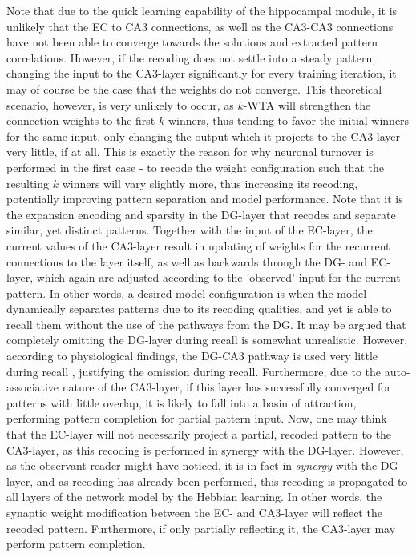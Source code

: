 Note that due to the quick learning capability of the hippocampal module, it is unlikely that the EC to CA3 connections, as well as the CA3-CA3 connections have not been able to converge towards the solutions and extracted pattern correlations. However, if the recoding does not settle into a steady pattern, changing the input to the CA3-layer significantly for every training iteration, it may of course be the case that the weights do not converge. This theoretical scenario, however, is very unlikely to occur, as $k$-WTA will strengthen the connection weights to the first $k$ winners, thus tending to favor the initial winners for the same input, only changing the output which it projects to the CA3-layer very little, if at all.
This is exactly the reason for why neuronal turnover is performed in the first case - to recode the weight configuration such that the resulting $k$ winners will vary slightly more, thus increasing its recoding, potentially improving pattern separation and model performance. Note that it is the expansion encoding and sparsity in the DG-layer that recodes and separate similar, yet distinct patterns. Together with the input of the EC-layer, the current values of the CA3-layer result in updating of weights for the recurrent connections to the layer itself, as well as backwards through the DG- and EC-layer, which again are adjusted according to the 'observed' input for the current pattern. In other words, a desired model configuration is when the model dynamically separates patterns due to its recoding qualities, and yet is able to recall them without the use of the pathways from the DG.
It may be argued that completely omitting the DG-layer during recall is somewhat unrealistic. 
However, according to physiological findings, the DG-CA3 pathway is used very little during recall \citep{Wakagi2008}, justifying the omission during recall. 
Furthermore, due to the auto-associative nature of the CA3-layer, if this layer has successfully converged for patterns with little overlap, it is likely to fall into a basin of attraction, performing pattern completion for partial pattern input. Now, one may think that the EC-layer will not necessarily project a partial, recoded pattern to the CA3-layer, as this recoding is performed in synergy with the DG-layer. However, as the observant reader might have noticed, it is in fact in \textit{synergy} with the DG-layer, and as recoding has already been performed, this recoding is propagated to all layers of the network model by the Hebbian learning. In other words, the synaptic weight modification between the EC- and CA3-layer will reflect the recoded pattern. Furthermore, if only partially reflecting it, the CA3-layer may perform pattern completion.

